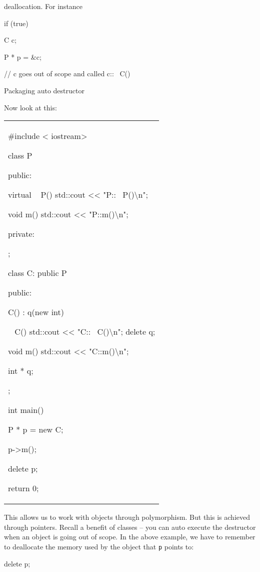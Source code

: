 deallocation. For instance

if (true)

{

C c;

P * p = \&c;

} // c goes out of scope and called c::~ C()

Packaging auto destructor

Now look at this:

\begin{longtable}[]{@{}
  >{\raggedright\arraybackslash}p{}@{}}
\toprule\noalign{}
 \\
\midrule\noalign{}
\endhead
\bottomrule\noalign{}
\endlastfoot
\#include < iostream\textgreater{}

class P

{

public:

\textbf{ }virtual ~ P() { std::cout <<{}
"P::~ P()\textbackslash n"; }

void m() { std::cout <<{} "P::m()\textbackslash n"; }

private:

};

class C: public P

{

public:

C() : q(new int) {}

~ C() { std::cout <<{}
"C::~ C()\textbackslash n"; delete q; }

void m() { std::cout <<{} "C::m()\textbackslash n"; }

int * q;

};

int main()

{

P * p = new C;

p-\textgreater m();

delete p;

return 0;

} \\
\end{longtable}

This allows us to work with objects through polymorphism. But this is
achieved through pointers. Recall a benefit of classes -- you can auto
execute the destructor when an object is going out of scope. In the
above example, we have to remember to deallocate the memory used by the
object that \texttt{p} points to:

delete p;

